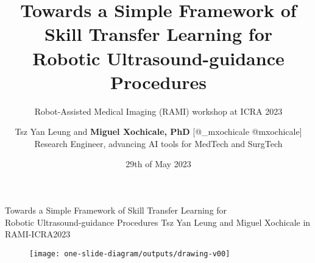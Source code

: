 \documentclass[xcolor={dvipsnames},aspectratio=169,10pt]{beamer}
\title{  
Towards a Simple Framework of Skill Transfer Learning for \\ Robotic Ultrasound-guidance Procedures
}
\subtitle{Robot-Assisted Medical Imaging (RAMI) workshop at ICRA 2023}
\author{
Tsz Yan Leung and
{\bf Miguel Xochicale, PhD} [\faTwitter @\_mxochicale  \faGithub @mxochicale] \\
Research Engineer, advancing AI tools for MedTech and SurgTech 
}
\date{
29th of May 2023
}
\institute{
Advanced Research Computing Centre and WEISS \\
University College London
}
\begin{document}
\maketitle


{

\begin{frame}{
Towards a Simple Framework of Skill Transfer Learning for \\
Robotic Ultrasound-guidance Procedures
}{
Tsz Yan Leung and Miguel Xochicale in RAMI-ICRA2023
}

      \begin{figure}
        \centering
        \texttt{[image: one-slide-diagram/outputs/drawing-v00]}
      \end{figure}
\end{frame}
}
\end{document}
